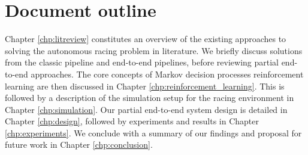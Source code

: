 \section{Document outline}
\label{sec:outline}

Chapter \ref{chp:litreview} constitutes an overview of the existing approaches to solving the autonomous racing problem in literature. 
We briefly discuss solutions from the classic pipeline and end-to-end pipelines, before reviewing partial end-to-end approaches. 
The core concepts of Markov decision processes reinforcement learning are then discussed in Chapter \ref{chp:reinforcement_learning}.
This is followed by a description of the simulation setup for the racing environment in Chapter \ref{chp:simulation}.
Our partial end-to-end system design is detailed in Chapter \ref{chp:design}, followed by experiments and results in Chapter \ref{chp:experiments}. 
We conclude with a summary of our findings and proposal for future work in Chapter \ref{chp:conclusion}.

